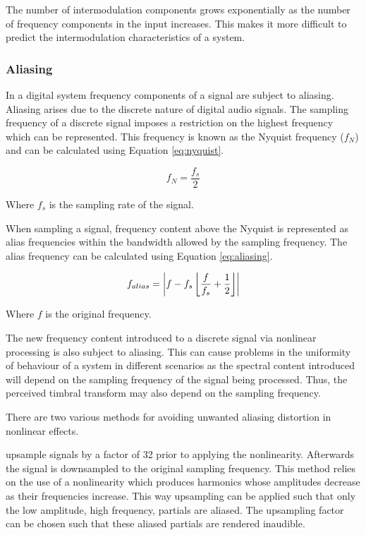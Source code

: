 			The number of intermodulation components grows exponentially as the number of frequency components
			in the input increases. This makes it more difficult to predict the intermodulation characteristics
			of a system.

		\subsubsection*{Aliasing}
			In a digital system frequency components of a signal are subject to aliasing. Aliasing arises due
			to the discrete nature of digital audio signals. The sampling frequency of a discrete signal imposes
			a restriction on the highest frequency which can be represented. This frequency is known as the
			Nyquist frequency ($f_{N}$) and can be calculated using Equation \ref{eq:nyquist}.

			\begin{equation}
				f_{N} = \frac{f_{s}}{2}
				\label{eq:nyquist}
			\end{equation}

			Where $f_{s}$ is the sampling rate of the signal.

			When sampling a signal, frequency content above the Nyquist is represented as alias frequencies
			within the bandwidth allowed by the sampling frequency. The alias frequency can be calculated using
			Equation \ref{eq:aliasing}.

			\begin{equation}
				f_{alias} = \left|f - f_{s}\left\lfloor\frac{f}{f_{s}} + \frac{1}{2}\right\rfloor\right|
				\label{eq:aliasing}
			\end{equation}

			Where $f$ is the original frequency.

			The new frequency content introduced to a discrete signal via nonlinear processing is also subject
			to aliasing. This can cause problems in the uniformity of behaviour of a system in different
			scenarios as the spectral content introduced will depend on the sampling frequency of the signal
			being processed. Thus, the perceived timbral transform may also depend on the sampling frequency.

			There are two various methods for avoiding unwanted aliasing distortion in nonlinear effects.

			\citep{vetter2013estimation} upsample signals by a factor of 32 prior to applying the nonlinearity.
			Afterwards the signal is downsampled to the original sampling frequency. This method relies on the
			use of a nonlinearity which produces harmonics whose amplitudes decrease as their frequencies
			increase. This way upsampling can be applied such that only the low amplitude, high frequency,
			partials are aliased. The upsampling factor can be chosen such that these aliased partials are
			rendered inaudible.

